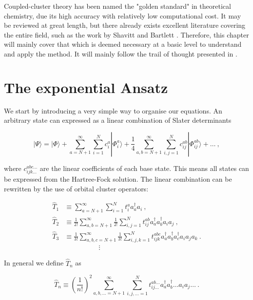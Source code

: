 \documentclass[10pt,twoside]{report}
\begin{document}
	Coupled-cluster theory has been named the "golden standard" in theoretical chemistry, due its high accuracy with relatively low computational cost. It may be reviewed at great length, but there already exists excellent literature covering the entire field, such as the work by Shavitt and Bartlett \cite{ShavittBartlett09}. Therefore, this chapter will mainly cover that which is deemed necessary at a basic level to understand and apply the method. It will mainly follow the trail of thought presented in \cite{ShavittBartlett09}.
	
	
	\section{The exponential Ansatz}
	We start by introducing a very simple way to organise our equations. An arbitrary state can expressed as a linear combination of Slater determinants
	
	\begin{equation}
		|\Psi\rangle = |\Phi\rangle + \sum_{a=N+1}^\infty\sum_{i=1}^Nc_i^a|\Phi_i^a\rangle + \frac{1}{4}\sum_{a,b=N+1}^\infty\sum_{i,j=1}^Nc_{ij}^{ab}|\Phi_{ij}^{ab}\rangle +\ldots \:,
		\label{EQ 3.1 general WF}
	\end{equation}
	
	\noindent where $c_{ijk\ldots}^{abc\ldots}$ are the linear coefficients of each base state. This means all states can be expressed from the Hartree-Fock solution. The linear combination can be rewritten by the use of orbital cluster operators:
	
	\begin{align}
		\hat{T}_1 &\equiv \sum_{a=N+1}^\infty\sum_{i=1}^Nt_i^a a_a^\dagger a_i \:,\\
		\hat{T}_2 &\equiv \frac{1}{2!}\sum_{a,b=N+1}^\infty\frac{1}{2!}\sum_{i,j=1}^Nt_{ij}^{ab} a_a^\dagger a_b^\dagger a_ ia_j \:,\\
		\hat{T}_3 &\equiv \frac{1}{3!}\sum_{a,b,c=N+1}^\infty\frac{1}{3!}\sum_{i,j,k=1}^Nt_{ijk}^{abc} a_a^\dagger a_b^\dagger a_c^\dagger a_ia_ja_k \:.\\
		&\quad\quad\quad\quad\quad\vdots
	\end{align}
	
	In general we define $\hat{T}_n$ as
	
	\begin{equation}
		\hat{T}_n \equiv \left(\frac{1}{n!}\right)^2\sum_{a,b,\ldots=N+1}^\infty\sum_{i,j,\ldots=1}^N t_{ij\ldots}^{ab\ldots} a_a^\dagger a_b^\dagger \ldots a_ia_j\ldots \:.
	\end{equation}
	
\end{document}
